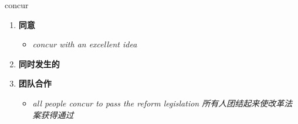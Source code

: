 
\begin{frame}
{\huge concur}
\begin{center}
\begin{enumerate}\Large
  \item \textbf{同意}
  \begin{itemize}
    \item \em{\Large{concur with an excellent idea}}
  \end{itemize}
  \item \textbf{同时发生的}
  \item \textbf{团队合作}
  \begin{itemize}
    \item \em{\Large{all people concur to pass the reform legislation 所有人团结起来使改革法案获得通过}}
  \end{itemize}
\end{enumerate}
\end{center}
\end{frame}
